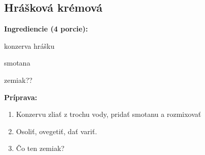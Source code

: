 \setcounter{step}{0}

\subsection{ Hrášková krémová }

\begin{ingredient}
  
  \def\portions{  }
  \textbf{ {\normalsize Ingrediencie (4 porcie):} }

  \begin{main}
      \item konzerva hrášku
      \item smotana
      \item zemiak??
  \end{main}
  
\end{ingredient}
\begin{recipe}
\textbf{ {\normalsize Príprava:} }
\begin{enumerate}

  \item{Konzervu zliať z trochu vody, pridať smotanu a rozmixovať}
  \item{Osoliť, ovegetiť, dať variť.}
  \item{Čo ten zemiak?}

\end{enumerate}
\end{recipe}

\begin{notes}
  
\end{notes}	
\clearpage
